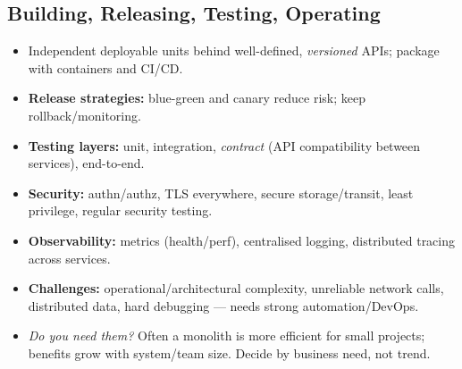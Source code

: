 \documentclass[hidelinks]{article}
\begin{document}
\subsection{Building, Releasing, Testing, Operating}
\begin{itemize}
  \item Independent deployable units behind well-defined, \emph{versioned} APIs; package with
        containers and CI/CD.
  \item \textbf{Release strategies:} blue-green and canary reduce risk; keep rollback/monitoring.
  \item \textbf{Testing layers:} unit, integration, \emph{contract} (API compatibility between
        services), end-to-end.
  \item \textbf{Security:} authn/authz, TLS everywhere, secure storage/transit, least privilege,
        regular security testing.
  \item \textbf{Observability:} metrics (health/perf), centralised logging, distributed tracing
        across services.
  \item \textbf{Challenges:} operational/architectural complexity, unreliable network calls,
        distributed data, hard debugging --- needs strong automation/DevOps.
  \item \emph{Do you need them?} Often a monolith is more efficient for small projects; benefits
        grow with system/team size. Decide by business need, not trend.
\end{itemize}
\end{document}
